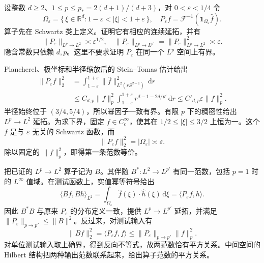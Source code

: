 \begin{exercise}\label{b2:ex:23-new-3}
设整数 \(d\geq2\)、\(1\leq p\leq p_*=2(d+1)/(d+3)\)，对 \(0<\varepsilon<1/4\) 令
\[
 \Omega_\varepsilon=\{\,\xi\in\mathbb R^d:1-\varepsilon<|\xi|<1+\varepsilon\,\},
 \quad
 P_\varepsilon f=\mathcal F^{-1}(\mathbf1_{\Omega_\varepsilon}\widehat f).
\]
算子先在 Schwartz 类上定义。证明它有相应的连续延拓，并有
\[
 \|P_\varepsilon\|_{L^p\to L^2}\asymp\varepsilon^{1/2},
 \quad
 \|P_\varepsilon\|_{L^p\to L^{p'}}
   =\|P_\varepsilon\|_{L^p\to L^2}^2
   \asymp\varepsilon.
\]
隐含常数只依赖 \(d,p\)。这里不要求证明 \(P_\varepsilon\) 在同一个 \(L^p\) 空间上有界。
\end{exercise}
\begin{solution}
Plancherel、极坐标和半径缩放后的 Stein--Tomas 估计给出
\[
 \begin{aligned}
 \|P_\varepsilon f\|_2^2
 &=\int_{1-\varepsilon}^{1+\varepsilon}
       \|\widehat f\|_{L^2(rS^{d-1})}^2\,\mathrm dr\\
 &\leq C_{d,p}\|f\|_p^2
       \int_{1-\varepsilon}^{1+\varepsilon}
              r^{d-1-2d/p'}\,\mathrm dr
 \leq C'_{d,p}\varepsilon\|f\|_p^2.
 \end{aligned}
\]
半径始终位于 \((3/4,5/4)\)，所以幂因子一致有界。有限 \(p\) 下的稠密性给出 \(L^p\to L^2\) 延拓。为求下界，固定 \(\widehat f\in C_c^\infty\)，使其在 \(1/2\leq|\xi|\leq3/2\) 上恒为一。这个 \(f\) 是与 \(\varepsilon\) 无关的 Schwartz 函数，而
\[
 \|P_\varepsilon f\|_2^2=|\Omega_\varepsilon|\asymp\varepsilon.
\]
除以固定的 \(\|f\|_p^2\)，即得第一条范数等价。

把已证的 \(L^p\to L^2\) 算子记为 \(B\)。其伴随 \(B^*:L^2\to L^{p'}\) 有同一范数，包括 \(p=1\) 时的 \(L^\infty\) 值域。在测试函数上，实值幂等符号给出
\[
 \langle Bf,Bh\rangle_{L^2}
 =\int_{\Omega_\varepsilon}\widehat f(\xi)\cdot\overline{\widehat h(\xi)}\,\mathrm d\xi
 =\langle P_\varepsilon f,h\rangle.
\]
因此 \(B^*B\) 与原来 \(P_\varepsilon\) 的分布定义一致，提供 \(L^p\to L^{p'}\) 延拓，并满足 \(\|P_\varepsilon\|_{p\to p'}\leq\|B\|^2\)。反过来，对测试输入有
\[
 \|Bf\|_2^2
 =\langle P_\varepsilon f,f\rangle
 \leq\|P_\varepsilon\|_{p\to p'}\|f\|_p^2.
\]
对单位测试输入取上确界，得到反向不等式，故两范数恰有平方关系。中间空间的 Hilbert 结构把两种输出范数联系起来，给出算子范数的平方关系。
\end{solution}

